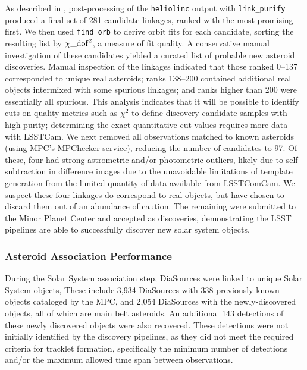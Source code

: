As described in , post-processing of the \texttt{heliolinc} output with \texttt{link\_purify} produced a final set of 281 candidate linkages, ranked with the most promising first. 
We then used \texttt{find\_orb} \citep{findorb} to derive orbit fits for each candidate, sorting the resulting list by $\chi\_{\rm dof}^2$, a measure of fit quality. 
A conservative manual investigation of these candidates yielded a curated list of \nnewasteroiddiscoveries probable new asteroid discoveries.
Manual inspection of the linkages indicated that those ranked 0--137 corresponded to unique real asteroids; ranks 138--200 contained additional real objects intermixed with some spurious linkages; and ranks higher than 200 were essentially all spurious.
This analysis indicates that it will be possible to identify cuts on quality metrics such as $\chi^2$ to define discovery candidate samples with high purity; determining the exact quantitative cut values requires more data with \gls{LSSTCam}.
We next removed all observations matched to known asteroids (using \gls{MPC}'s MPChecker service), reducing the number of candidates to 97.
Of these, four had strong astrometric and/or photometric outliers, likely due to self-subtraction in difference images due to the unavoidable limitations of template generation from the limited quantity of data available from  \gls{LSSTComCam}.
We suspect these four linkages do correspond to real objects, but have chosen to discard them out of an abundance of caution.
The remaining \nnewasteroiddiscoveries were submitted to the Minor Planet Center and accepted as  discoveries, demonstrating the \gls{LSST} pipelines are able to successfully discover new solar system objects.

\subsubsection{Asteroid Association Performance}
\label{ssec:asteroid_association}

During the Solar System association step,  \nsolarsystemsources DiaSources were linked to \nsolarsystemobjects  unique Solar System objects, 
These include 3,934 DiaSources with 338 previously known objects cataloged by the \gls{MPC}, and 2,054 DiaSources with the \nnewasteroiddiscoveries  newly-discovered objects, all of which are main belt asteroids. 
An additional 143 detections of these newly discovered objects were also recovered. 
These detections were not initially identified by the discovery pipelines, as they did not meet the required criteria for tracklet formation, specifically the minimum number of detections and/or the maximum allowed time span between observations.

